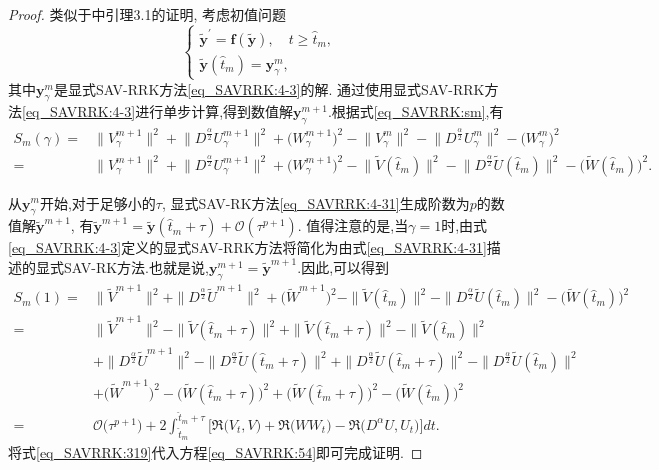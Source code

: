 \begin{proof}
类似于\cite{liImplicitexplicitRelaxationRungeKutta2022}中引理3.1的证明,
考虑初值问题
\begin{equation}
\left\{\begin{array}{l}
\tilde{\bm{y}}^{\prime}=\bm{f}(\tilde{\bm{y}}), \quad t \geq \hat{t}_m, \\
\tilde{\bm{y}}\left(\hat{t}_m\right)=\bm{y}_\gamma^m,
\end{array}\right.
\end{equation}
其中$\bm{y}_\gamma^m$是显式SAV-RRK方法\eqref{eq_SAVRRK:4-3}的解.
通过使用显式SAV-RRK方法\eqref{eq_SAVRRK:4-3}进行单步计算,得到数值解$\bm{y}_\gamma^{m+1}$.根据式\eqref{eq_SAVRRK:sm},有
\begin{equation}
\begin{aligned}
S_m(\gamma) \!=& \|V_\gamma^{m+1}\|^2 \!+\! \|D^\frac{\alpha}{2} U_\gamma^{m+1}\|^2\!+\!\big(W_\gamma^{m+1}\big)^2\!-\!\|V_\gamma^{m}\|^2 \!-\! \|D^\frac{\alpha}{2} U_\gamma^{m}\|^2\!-\!\big(W_\gamma^{m}\big)^2\\
\!=& \|V_\gamma^{m+1}\|^2 \!+\! \|D^\frac{\alpha}{2} U_\gamma^{m+1}\|^2\!+\!\big(W_\gamma^{m+1}\big)^2\!-\!\|\tilde{V}(\hat{t}_{m})\|^2 \!-\! \|D^\frac{\alpha}{2} \tilde{U}(\hat{t}_{m})\|^2\!-\!\big(\tilde{W}(\hat{t}_{m})\big)^2.
\end{aligned}
\end{equation}

从$\bm{y}_\gamma^m$开始,对于足够小的$\tau$, 显式SAV-RK方法\eqref{eq_SAVRRK:4-31}生成阶数为$p$的数值解$\tilde{\bm{y}}^{m+1}$,
有$\tilde{\bm{y}}^{m+1}=\tilde{\bm{y}}\left(\hat{t}_m+\tau\right)+\mathcal{O}\left(\tau^{p+1}\right)$.
值得注意的是,当$\gamma=1$时,由式\eqref{eq_SAVRRK:4-3}定义的显式SAV-RRK方法将简化为由式\eqref{eq_SAVRRK:4-31}描述的显式SAV-RK方法.也就是说,$\bm{y}_\gamma^{m +1}=\tilde{\bm{y}}^{m +1}$.因此,可以得到
\begin{align}
S_m(1) = &\|\tilde{V}^{m+1}\|^2 + \|D^\frac{\alpha}{2} \tilde{U}^{m+1}\|^2+\big(\tilde{W}^{m+1}\big)^2-\|\tilde{V}(\hat{t}_{m})\|^2 - \|D^\frac{\alpha}{2} \tilde{U}(\hat{t}_{m})\|^2-\big(\tilde{W}(\hat{t}_{m})\big)^2 \nonumber\\
= &\|\tilde{V}^{m+1}\|^2 -\|\tilde{V}(\hat{t}_{m}+\tau)\|^2 +\|\tilde{V}(\hat{t}_{m}+\tau)\|^2-\|\tilde{V}(\hat{t}_{m})\|^2\nonumber\\
& + \|D^\frac{\alpha}{2} \tilde{U}^{m+1}\|^2 -\|D^\frac{\alpha}{2} \tilde{U}(\hat{t}_{m}+\tau)\|^2+\|D^\frac{\alpha}{2} \tilde{U}(\hat{t}_{m}+\tau)\|^2- \|D^\frac{\alpha}{2} \tilde{U}(\hat{t}_{m})\|^2\nonumber\\
& +\big(\tilde{W}^{m+1}\big)^2 -\big(\tilde{W}(\hat{t}_{m}+\tau)\big)^2+\big(\tilde{W}(\hat{t}_{m}+\tau)\big)^2-\big(\tilde{W}(\hat{t}_{m})\big)^2 \nonumber\\
= &\mathcal{O}\big(\tau^{p+1}\big) +2\int_{\hat{t}_m}^{\hat{t}_m+\tau}\big[\Re\big(V_t, V\big) + \Re\big(W W_t\big) - \Re\big(D^{\alpha} U, U_t\big)\big]dt.\label{eq_SAVRRK:54}
\end{align}
将式\eqref{eq_SAVRRK:319}代入方程\eqref{eq_SAVRRK:54}即可完成证明.
\end{proof}

